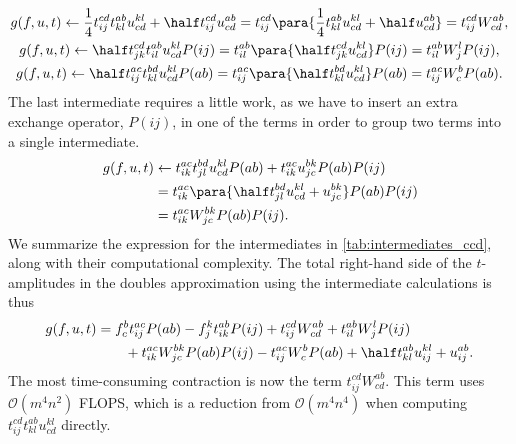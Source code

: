         \begin{gather}
            g(f, u, t)
            \gets
            \frac{1}{4} t^{cd}_{ij} t^{ab}_{kl} u^{kl}_{cd}
            + \half t^{cd}_{ij} u^{ab}_{cd}
            =
            t^{cd}_{ij}\para{
                \frac{1}{4} t^{ab}_{kl} u^{kl}_{cd}
                + \half u^{ab}_{cd}
            }
            = t^{cd}_{ij}W^{ab}_{cd},
            \\
            g(f, u, t)
            \gets
            \half t^{cd}_{jk} t^{ab}_{il} u^{kl}_{cd} P(ij)
            = t^{ab}_{il}\para{
                \half t^{cd}_{jk} u^{kl}_{cd}
            } P(ij)
            = t^{ab}_{il} W^{l}_{j} P(ij),
            \\
            g(f, u, t)
            \gets
            \half t^{ac}_{ij} t^{bd}_{kl} u^{kl}_{cd} P(ab)
            = t^{ac}_{ij}\para{
                \half t^{bd}_{kl} u^{kl}_{cd}
            } P(ab)
            = t^{ac}_{ij} W^{b}_{c} P(ab).
        \end{gather}
        The last intermediate requires a little work, as we have to insert an
        extra exchange operator, $P(ij)$, in one of the terms in order to group
        two terms into a single intermediate.
        \begin{align}
            g(f, u, t)
            &\gets
            t^{ac}_{ik} t^{bd}_{jl} u^{kl}_{cd} P(ab)
            + t^{ac}_{ik} u^{bk}_{jc} P(ab) P(ij)
            \\
            &= t^{ac}_{ik}\para{
                \half t^{bd}_{jl} u^{kl}_{cd}
                + u^{bk}_{jc}
            } P(ab) P(ij)
            \\
            &= t^{ac}_{ik} W^{bk}_{jc} P(ab) P(ij).
        \end{align}
        We summarize the expression for the intermediates in
        \autoref{tab:intermediates_ccd}, along with their computational
        complexity. The total right-hand side of the $t$-amplitudes in the
        doubles approximation using the intermediate calculations is thus
        \begin{align}
            g(f, u, t)
            &=
            f^{b}_{c} t^{ac}_{ij} P(ab)
            - f^{k}_{j} t^{ab}_{ik} P(ij)
            + t^{cd}_{ij} W^{ab}_{cd}
            + t^{ab}_{il} W^{l}_{j} P(ij)
            \nonumber \\
            &\qquad
            + t^{ac}_{ik} W^{bk}_{jc} P(ab) P(ij)
            - t^{ac}_{ij} W^{b}_{c} P(ab)
            + \half t^{ab}_{kl} u^{kl}_{ij}
            + u^{ab}_{ij}.
        \end{align}
        The most time-consuming contraction is now the term $t^{cd}_{ij}
        W^{ab}_{cd}$. This term uses $\mathcal{O}(m^4 n^2)$ FLOPS, which is a
        reduction from $\mathcal{O}(m^4 n^4)$ when computing $t^{cd}_{ij}
        t^{ab}_{kl} u^{kl}_{cd}$ directly.

